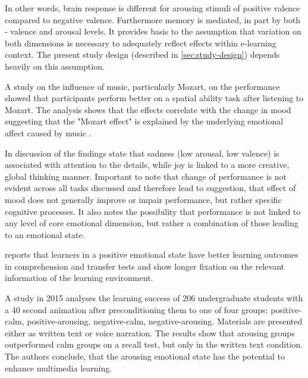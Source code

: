 		In other words, brain response is different for arousing stimuli of positive valence compared to negative valence. Furthermore memory is mediated, in part by both - valence and arousal levels. It provides basis to the assumption that variation on both dimensions is necessary to adequately reflect effects within e-learning context. The present study design (described in \ref{sec:study-design}) depends heavily on this assumption.	
				
		A study on the influence of music, particularly Mozart, on the performance showed that participants perform better on a spatial ability task after listening to Mozart. The analysis shows that the effects correlate with the change in mood suggesting that the "Mozart effect" is explained by the underlying emotional affect caused by music \cite{Thompson2001}.

		In discussion of the findings \cite{Jefferies2008} state that sadness (low arousal, low valence) is associated with attention to the details, while joy is linked to a more creative, global thinking manner. Important to note that change of performance is not evident across all tasks discussed and therefore lead to suggestion, that effect of mood does not generally improve or impair performance, but rather specific cognitive processes. It also notes the possibility that performance is not linked to any level of core emotional dimension, but rather a combination of those leading to an emotional state.
		
		\cite{Park2015} reports that learners in a positive emotional state have better learning outcomes in comprehension and transfer tests and show longer fixation on the relevant information of the learning environment.
		
		A study in 2015 analyses the learning success of 206 undergraduate students with a 40 second animation after preconditioning them to one of four groups: positive-calm, positive-arousing, negative-calm, negative-arousing. Materials are presented either as written text or voice narration. The results show that arousing groups outperformed calm groups on a recall test, but only in the written text condition. The authors conclude, that the arousing emotional state has the potential to enhance multimedia learning. \cite{Chung2015}

		
